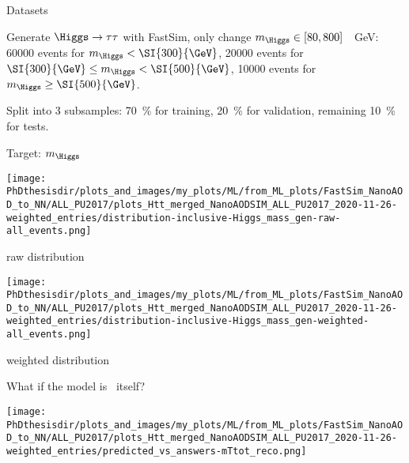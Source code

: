 \begin{frame}{Datasets}

\manip Generate $\Higgs\to\tau\tau$ with FastSim, only change $m_{\Higgs} \in [80, 800]$~\SI{}{\GeV}:
\submanip \num{60000} events for $m_{\Higgs} < \SI{300}{\GeV}$,
\submanip \num{20000} events for $\SI{300}{\GeV} \leq m_{\Higgs} < \SI{500}{\GeV}$,
\submanip \num{10000} events for $m_{\Higgs} \geq \SI{500}{\GeV}$.

\vfill

\manip Split into 3 subsamples:
\submanip \SI{70}{\%} for training,
\submanip \SI{20}{\%} for validation,
\submanip remaining \SI{10}{\%} for tests.

\end{frame}


\begin{frame}{Target: $m_{\Higgs}$}

\begin{center}
\begin{minipage}[t]{.4\textwidth}
\begin{center}
\texttt{[image: \\PhDthesisdir/plots\_and\_images/my\_plots/ML/from\_ML\_plots/FastSim\_NanoAOD\_to\_NN/ALL\_PU2017/plots\_Htt\_merged\_NanoAODSIM\_ALL\_PU2017\_2020-11-26-weighted\_entries/distribution-inclusive-Higgs\_mass\_gen-raw-all\_events.png]}

raw distribution
\end{center}
\end{minipage}
\qquad\qquad
\begin{minipage}[t]{.4\textwidth}
\begin{center}
\texttt{[image: \\PhDthesisdir/plots\_and\_images/my\_plots/ML/from\_ML\_plots/FastSim\_NanoAOD\_to\_NN/ALL\_PU2017/plots\_Htt\_merged\_NanoAODSIM\_ALL\_PU2017\_2020-11-26-weighted\_entries/distribution-inclusive-Higgs\_mass\_gen-weighted-all\_events.png]}

weighted distribution
\end{center}
\end{minipage}
\end{center}

\end{frame}

\begin{frame}{What if the model is \mTtot\ itself?}
\begin{center}\vspace{-4pt}
\texttt{[image: \\PhDthesisdir/plots\_and\_images/my\_plots/ML/from\_ML\_plots/FastSim\_NanoAOD\_to\_NN/ALL\_PU2017/plots\_Htt\_merged\_NanoAODSIM\_ALL\_PU2017\_2020-11-26-weighted\_entries/predicted\_vs\_answers-mTtot\_reco.png]}
\end{center}\vspace{-5pt}
\end{frame}